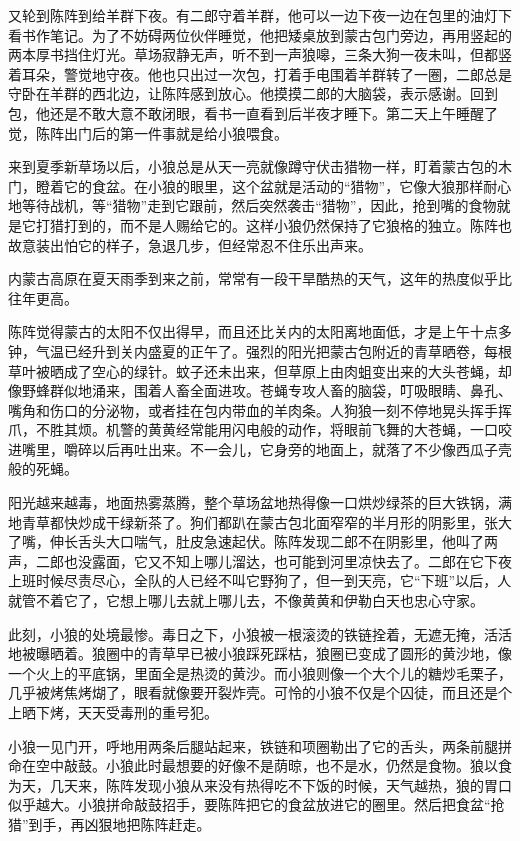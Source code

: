 \par 又轮到陈阵到给羊群下夜。有二郎守着羊群，他可以一边下夜一边在包里的油灯下看书作笔记。为了不妨碍两位伙伴睡觉，他把矮桌放到蒙古包门旁边，再用竖起的两本厚书挡住灯光。草场寂静无声，听不到一声狼嗥，三条大狗一夜未叫，但都竖着耳朵，警觉地守夜。他也只出过一次包，打着手电围着羊群转了一圈，二郎总是守卧在羊群的西北边，让陈阵感到放心。他摸摸二郎的大脑袋，表示感谢。回到包，他还是不敢大意不敢闭眼，看书一直看到后半夜才睡下。第二天上午睡醒了觉，陈阵出门后的第一件事就是给小狼喂食。
\par 来到夏季新草场以后，小狼总是从天一亮就像蹲守伏击猎物一样，盯着蒙古包的木门，瞪着它的食盆。在小狼的眼里，这个盆就是活动的“猎物”，它像大狼那样耐心地等待战机，等“猎物”走到它跟前，然后突然袭击“猎物”，因此，抢到嘴的食物就是它打猎打到的，而不是人赐给它的。这样小狼仍然保持了它狼格的独立。陈阵也故意装出怕它的样子，急退几步，但经常忍不住乐出声来。
\par 内蒙古高原在夏天雨季到来之前，常常有一段干旱酷热的天气，这年的热度似乎比往年更高。
\par 陈阵觉得蒙古的太阳不仅出得早，而且还比关内的太阳离地面低，才是上午十点多钟，气温已经升到关内盛夏的正午了。强烈的阳光把蒙古包附近的青草晒卷，每根草叶被晒成了空心的绿针。蚊子还未出来，但草原上由肉蛆变出来的大头苍蝇，却像野蜂群似地涌来，围着人畜全面进攻。苍蝇专攻人畜的脑袋，叮吸眼睛、鼻孔、嘴角和伤口的分泌物，或者挂在包内带血的羊肉条。人狗狼一刻不停地晃头挥手挥爪，不胜其烦。机警的黄黄经常能用闪电般的动作，将眼前飞舞的大苍蝇，一口咬进嘴里，嚼碎以后再吐出来。不一会儿，它身旁的地面上，就落了不少像西瓜子壳般的死蝇。
\par 阳光越来越毒，地面热雾蒸腾，整个草场盆地热得像一口烘炒绿茶的巨大铁锅，满地青草都快炒成干绿新茶了。狗们都趴在蒙古包北面窄窄的半月形的阴影里，张大了嘴，伸长舌头大口喘气，肚皮急速起伏。陈阵发现二郎不在阴影里，他叫了两声，二郎也没露面，它又不知上哪儿溜达，也可能到河里凉快去了。二郎在它下夜上班时候尽责尽心，全队的人已经不叫它野狗了，但一到天亮，它“下班”以后，人就管不着它了，它想上哪儿去就上哪儿去，不像黄黄和伊勒白天也忠心守家。
\par 此刻，小狼的处境最惨。毒日之下，小狼被一根滚烫的铁链拴着，无遮无掩，活活地被曝晒着。狼圈中的青草早已被小狼踩死踩枯，狼圈已变成了圆形的黄沙地，像一个火上的平底锅，里面全是热烫的黄沙。而小狼则像一个大个儿的糖炒毛栗子，几乎被烤焦烤煳了，眼看就像要开裂炸壳。可怜的小狼不仅是个囚徒，而且还是个上晒下烤，天天受毒刑的重号犯。
\par 小狼一见门开，呼地用两条后腿站起来，铁链和项圈勒出了它的舌头，两条前腿拼命在空中敲鼓。小狼此时最想要的好像不是荫晾，也不是水，仍然是食物。狼以食为天，几天来，陈阵发现小狼从来没有热得吃不下饭的时候，天气越热，狼的胃口似乎越大。小狼拼命敲鼓招手，要陈阵把它的食盆放进它的圈里。然后把食盆“抢猎”到手，再凶狠地把陈阵赶走。
